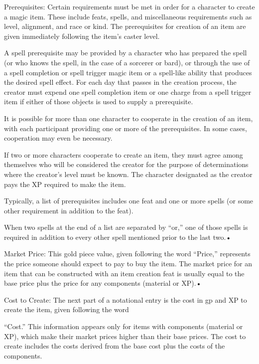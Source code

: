 \documentclass{article}
\begin{document}
\parindent=3pt
Prerequisites: Certain requirements must be met in order for a character to create 
a magic item. These include feats, spells, and miscellaneous requirements such 
as level, alignment, and race or kind. The prerequisites for creation of an item 
are given immediately following the item's caster level.

\parindent=0pt
A spell prerequisite may be provided by a character who has prepared the spell 
(or who knows the spell, in the case of a sorcerer or bard), or through the use 
of a spell completion or spell trigger magic item or a spell-like ability that 
produces the desired spell effect. For each day that passes in the creation process, 
the creator must expend one spell completion item or one charge from a spell trigger 
item if either of those objects is used to supply a prerequisite.

It is possible for more than one character to cooperate in the creation of an item, 
with each participant providing one or more of the prerequisites. In some cases, 
cooperation may even be necessary.

If two or more characters cooperate to create an item, they must agree among themselves 
who will be considered the creator for the purpose of determinations where the 
creator's level must be known. The character designated as the creator pays the 
XP required to make the item.

Typically, a list of prerequisites includes one feat and one or more spells (or 
some other requirement in addition to the feat).

When two spells at the end of a list are separated by ``or,'' one of those spells 
is required in addition to every other spell mentioned prior to the last two.• 

\parindent=3pt
Market Price: This gold piece value, given following the word ``Price,'' represents 
the price someone should expect to pay to buy the item. The market price for an 
item that can be constructed with an item creation feat is usually equal to the 
base price plus the price for any components (material or XP).• 

Cost to Create: The next part of a notational entry is the cost in gp and XP to 
create the item, given following the word

``Cost.'' This information appears only for items with components (material or 
XP), which make their market prices higher than their base prices. The cost to 
create includes the costs derived from the base cost plus the costs of the components.
\end{document}
